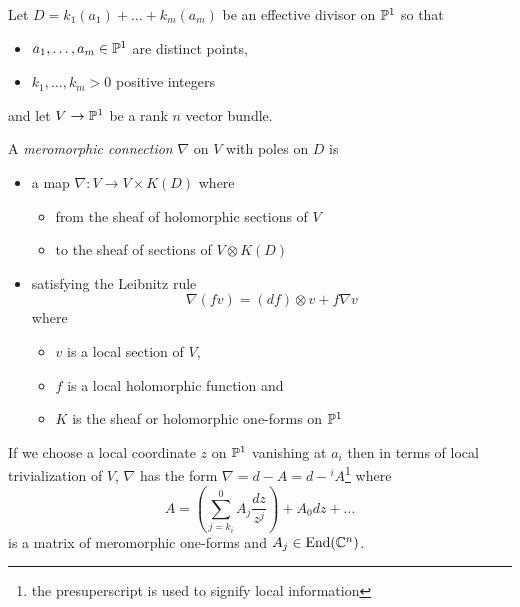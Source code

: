 \begin{frame}
Let $D=k_1(a_1)+\dots+k_m(a_m)$ be an effective divisor on $\P^1$ so that
\begin{itemize}
  \item $a_1,\dots,a_m\in\P^1$ are distinct points,
  \item $k_1,\dots,k_m>0$ positive integers
\end{itemize}
and let $V\to\P^1$ be a rank $n$ vector bundle.
\begin{defn}[2.1]
  A \emph{meromorphic connection} $\nabla$ on $V$ with poles on $D$ is
  \begin{itemize}
    \item a map $\nabla:V\to V\times K(D)$ where
      \begin{itemize}
        \item from the sheaf of holomorphic sections of $V$
        \item to the sheaf of sections of $V\otimes K(D)$
      \end{itemize}
    \item satisfying the Leibnitz rule
      \begin{equation}
        \nabla(fv)=(df)\otimes v + f\nabla v
      \end{equation}
      where
      \begin{itemize}
        \item $v$ is a local section of $V$,
        \item $f$ is a local holomorphic function and
        \item $K$ is the sheaf or holomorphic one-forms on $\P^1$
      \end{itemize}
  \end{itemize}
\end{defn}
If we choose a local coordinate $z$ on $\P^1$ vanishing at $a_i$ then in terms
of local trivialization of $V$, $\nabla$ has the form
$\nabla=d-A=d-{}^iA$\footnote{the presuperscript is used to signify local
information} where
\[
  A=\left(\sum^{0}_{j=k_i}A_j\frac{dz}{z^{j}}\right)+A_0dz+\dots
\]
is a matrix of meromorphic one-forms and $A_j\in\End(\C^n)$.
\end{frame}

